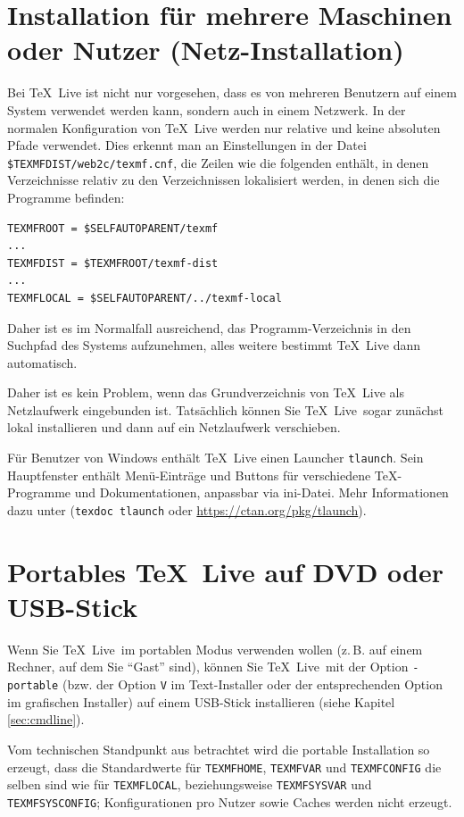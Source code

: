 \documentclass[12pt,ngerman,a4paper,fullparskip]{report}
\newcommand{\TL}{\TeX\ Live\xspace}
\newcommand{\code}[1]{\texttt{#1}}
\newcommand{\optname}[1]{\texttt{#1}}
\newcommand{\filename}[1]{\texttt{#1}}
\newcommand{\envname}[1]{\texttt{#1}}
\begin{document}
\chapter{Installation für mehrere Maschinen oder Nutzer (Netz-Installation)}
\label{sec:sharedinstall}

Bei \TL ist nicht nur vorgesehen, dass es von mehreren Benutzern auf einem System verwendet werden kann, sondern auch in einem Netzwerk. In der normalen Konfiguration von \TL werden nur relative und keine absoluten Pfade verwendet. Dies erkennt man an Einstellungen in der Datei {\small \filename{\$TEXMFDIST/web2c/texmf.cnf}}, die Zeilen wie die folgenden enthält, in denen Verzeichnisse relativ zu den Verzeichnissen lokalisiert werden, in denen sich die Programme befinden:

\begin{verbatim}
TEXMFROOT = $SELFAUTOPARENT/texmf
...
TEXMFDIST = $TEXMFROOT/texmf-dist
...
TEXMFLOCAL = $SELFAUTOPARENT/../texmf-local
\end{verbatim}

Daher ist es im Normalfall ausreichend, das Programm-Verzeichnis in den Suchpfad des Systems aufzunehmen, alles weitere bestimmt \TL dann automatisch.

Daher ist es kein Problem, wenn das Grundverzeichnis von \TL als Netz\-lauf\-werk eingebunden ist. Tatsächlich können Sie \TL\ sogar zunächst lokal installieren und dann auf ein Netzlaufwerk verschieben.

Für Benutzer von Windows enthält \TL{} einen Launcher \filename{tlaunch}. Sein Hauptfenster enthält Menü-Einträge und Buttons für verschiedene \TeX-Programme und Dokumentationen, anpassbar via ini-Datei.
Mehr Informationen dazu unter (\code{texdoc tlaunch} oder \url{https://ctan.org/pkg/tlaunch}).


\chapter{Portables \TL  auf DVD oder USB-Stick}\label{sec:portable-tl}

Wenn Sie \TL\ im portablen Modus verwenden wollen (z.\,B. auf einem Rechner, auf dem Sie "`Gast"' sind), können Sie \TL\ mit der Option \optname{-portable} (bzw. der Option \code{V} im Text-Installer oder der entsprechenden Option im grafischen Installer) auf einem USB-Stick installieren (siehe Kapitel \ref{sec:cmdline}). 

Vom technischen Standpunkt aus betrachtet wird die portable Installation so erzeugt, dass die Standardwerte für \envname{TEXMFHOME}, \envname{TEXMFVAR} und \envname{TEXMFCONFIG} die selben sind wie für \envname{TEXMFLOCAL}, beziehungsweise 
\envname{TEXMFSYSVAR}  und \envname{TEXMFSYSCONFIG}; Konfigurationen pro Nutzer sowie Caches werden nicht erzeugt.
\end{document}
